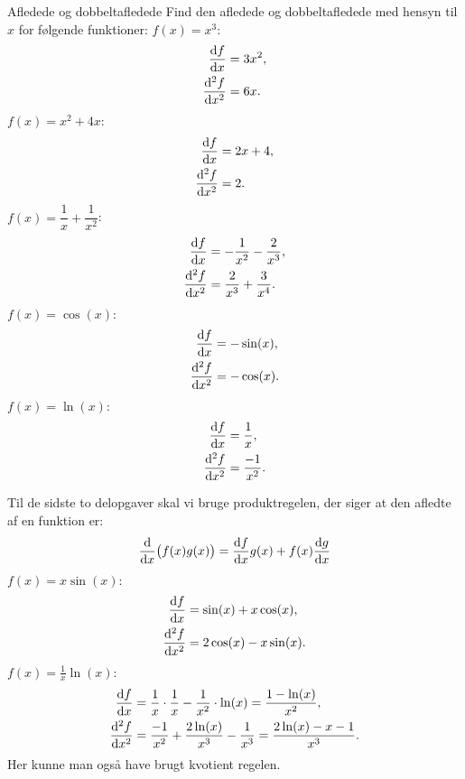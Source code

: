 \begin{opgave}[1]{Afledede og dobbeltafledede}
Find den afledede og dobbeltafledede med hensyn til $x$ for følgende funktioner:
\opg $f(x) = x^3$:
    \begin{align*}
        \dv{f}{x}&=3x^2, \\
        \dv[2]{f}{x}&=6x.
    \end{align*}
\opg $f(x) = x^2 + 4x$:
    \begin{align*}
        \dv{f}{x}&=2x+4,\\
        \dv[2]{f}{x}&=2.
    \end{align*}
\opg $f(x) = \dfrac{1}{x} + \dfrac{1}{x^2}$:
    \begin{align*}
        \dv{f}{x}&=-\frac{1}{x^2}-\frac{2}{x^3}, \\
        \dv[2]{f}{x}&=\frac{2}{x^3}+\frac{3}{x^4}.
    \end{align*}
\opg $f(x) = \cos(x)$:
    \begin{align*}
        \dv{f}{x}&=-\sin(x), \\
        \dv[2]{f}{x}&= -\cos(x).
    \end{align*}
\opg $f(x) = \ln(x)$:
    \begin{align*}
        \dv{f}{x}&=\frac{1}{x}, \\
        \dv[2]{f}{x}&=\frac{-1}{x^2}.
    \end{align*}

Til de sidste to delopgaver skal vi bruge produktregelen, der siger at den afledte af en funktion er:
%
\begin{align*}
    \dv{}{x}\big(f(x)g(x)\big)=\dv{f}{x}g(x)+f(x)\dv{g}{x}
\end{align*}
%
\opg $f(x) = x \sin(x)$:
    \begin{align*}
        \dv{f}{x}&=\sin(x)+x\cos(x), \\
        \dv[2]{f}{x}&=2\cos(x)-x\sin(x).
    \end{align*}
\opg $f(x) = \frac{1}{x} \ln(x)$:
    \begin{align*}
        \dv{f}{x}&=\frac{1}{x}\cdot \frac{1}{x}-\frac{1}{x^2}\cdot \ln(x)=\frac{1-\ln(x)}{x^2}, \\
        \dv[2]{f}{x}&=\frac{-1}{x^2}+\frac{2\ln(x)}{x^3}-\frac{1}{x^3}=\frac{2\ln(x)-x-1}{x^3}.
    \end{align*}
%
Her kunne man også have brugt kvotient regelen.
\end{opgave}

